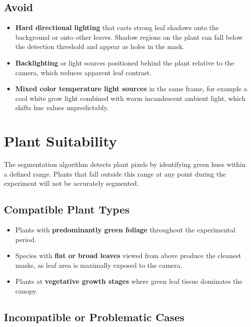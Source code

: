 \documentclass[12pt,a4paper,oneside]{report}
\begin{document}
\subsection*{Avoid}

\begin{itemize}
    \item \textbf{Hard directional lighting} that casts strong leaf shadows onto the background or onto other leaves. Shadow regions on the plant can fall below the detection threshold and appear as holes in the mask.
    \item \textbf{Backlighting} or light sources positioned behind the plant relative to the camera, which reduces apparent leaf contrast.
    \item \textbf{Mixed color temperature light sources} in the same frame, for example a cool white grow light combined with warm incandescent ambient light, which shifts hue values unpredictably.
\end{itemize}

\section{Plant Suitability}

The segmentation algorithm detects plant pixels by identifying green hues within a defined range. Plants that fall outside this range at any point during the experiment will not be accurately segmented.

\subsection*{Compatible Plant Types}

\begin{itemize}
    \item Plants with \textbf{predominantly green foliage} throughout the experimental period.
    \item Species with \textbf{flat or broad leaves} viewed from above produce the cleanest masks, as leaf area is maximally exposed to the camera.
    \item Plants at \textbf{vegetative growth stages} where green leaf tissue dominates the canopy.
\end{itemize}

\subsection*{Incompatible or Problematic Cases}
\end{document}
